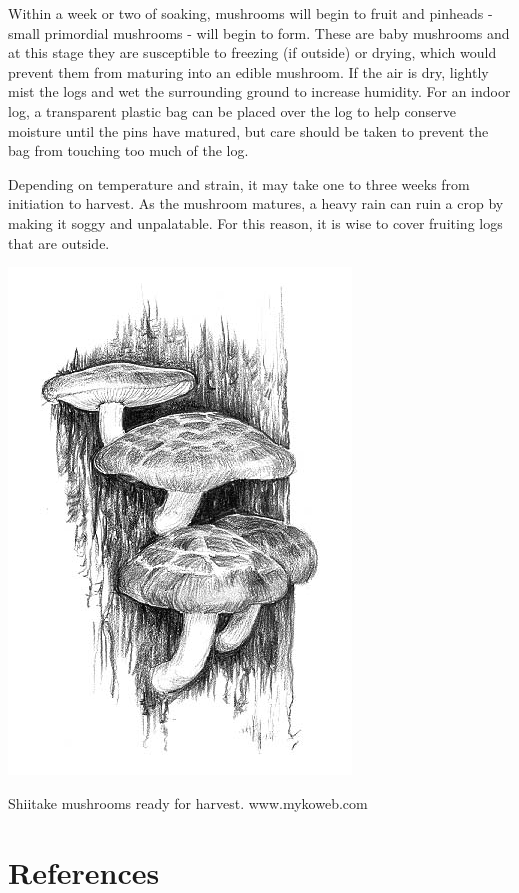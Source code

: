 \documentclass{tufte-handout}
\begin{document}
Within a week or two of soaking, mushrooms will begin to fruit and pinheads - small primordial mushrooms - will begin to form. These are baby mushrooms and at this stage they are susceptible to freezing (if outside) or drying, which would prevent them from maturing into an edible mushroom. 
If the air is dry, lightly mist the logs and wet the surrounding ground to increase humidity.
For an indoor log, a transparent plastic bag can be placed over the log to help conserve moisture until the pins have matured, but care should be taken to prevent the bag from touching too much of the log.

Depending on temperature and strain, it may take one to three weeks from initiation to harvest. 
As the mushroom matures, a heavy rain can ruin a crop by making it soggy and unpalatable. 
For this reason, it is wise to cover fruiting logs that are outside. 

\begin{marginfigure}
\includegraphics{figures/shiitake}
\caption{Shiitake mushrooms ready for harvest. www.mykoweb.com}
\end{marginfigure}

\section{References}
\end{document}
